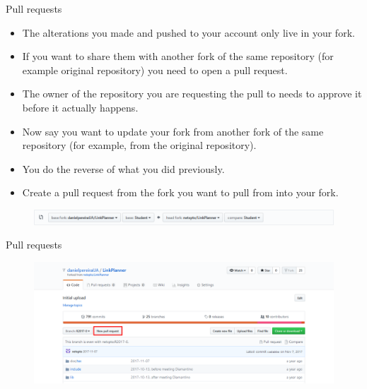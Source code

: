 \documentclass[usenames,dvipsnames,aspectratio=169]{beamer}
\newcommand{\aitem}{\item[$\cdot$]}
\begin{document}
\begin{frame}[t]{Pull requests}
\begin{itemize}
\aitem The alterations you made and pushed to your account only live in your fork.
\aitem If you want to share them with another fork of the same repository (for example original repository) you need to open a pull request.
\aitem The owner of the repository you are requesting the pull to needs to approve it before it actually happens.
\aitem Now say you want to update your fork from another fork of the same repository (for example, from the original repository).
\aitem You do the reverse of what you did previously.
\aitem Create a pull request from the fork you want to pull from into your fork.
\end{itemize}
\begin{figure}
\centering
\includegraphics[width=\linewidth]{pullrequest4}
\end{figure}
\end{frame}


\begin{frame}[t]{Pull requests}
\begin{figure}
\centering
\includegraphics[width=\linewidth]{pullrequest3}
\end{figure}
\end{frame}

\end{document}
